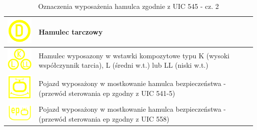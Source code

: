 \begin{table}
	\caption{Oznaczenia wyposażenia hamulca zgodnie z UIC 545 - cz. 2}
	\label{tab:opisyhamulcadwa}
	\begin{tabular}{|c|m{8cm}|}
		\hline
		\includegraphics[width=2.5cm]{skryptkierownik-img/symbol-uic-545-tarczowy.png} & Hamulec tarczowy\\
		\hline
		\includegraphics[width=2.5cm]{skryptkierownik-img/symbol-uic-545-wkladki-kompozytowe.png} & Hamulec wyposazony w wstawki kompozytowe typu K (wysoki współczynnik tarcia), L (średni w.t.) lub LL (niski w.t.)\\
		\hline
		\includegraphics[width=2.5cm]{skryptkierownik-img/symbol-uic-545-hamulec-bezp.png} & Pojazd wyposażony w mostkowanie hamulca bezpieczeństwa - (przewód sterowania ep zgodny z UIC 541-5)\\
		\hline
		\includegraphics[width=2.5cm]{skryptkierownik-img/symbol-uic-545-hamulec-bezp558.png} & Pojazd wyposażony w mostkowanie hamulca bezpieczeństwa - (przewód sterowania ep zgodny z UIC 558)\\
		\hline
	\end{tabular}
\end{table} 

